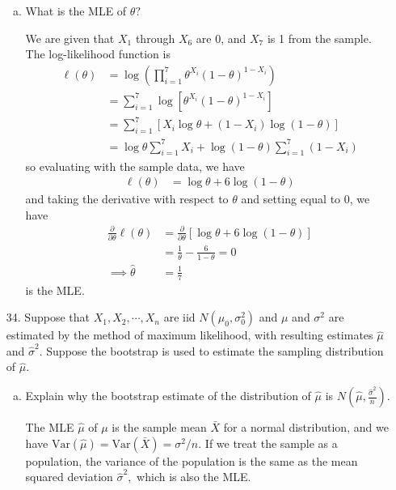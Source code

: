 \documentclass{article}
\newcommand{\var}{\mathrm{Var}}
\begin{document}
\begin{itemize}
\begin{enumerate}[a.]
			\item What is the MLE of $\theta?$
				\begin{soln}
					We are given that $X_1$ through $X_6$ are 0, and $X_7$ is 1 from the sample. The log-likelihood function is 
					\begin{align*}
						\ell(\theta) &= \log\left( \prod_{i=1}^7 \theta^{X_i}(1-\theta)^{1-X_i} \right) \\
						&= \sum_{i=1}^{7}\log\left[ \theta^{X_i}(1-\theta)^{1-X_i} \right] \\
						&= \sum_{i=1}^{7} \left[ X_i\log\theta + (1-X_i)\log (1-\theta) \right] \\
						&= \log\theta\sum_{i=1}^{7}X_i + \log(1-\theta)\sum_{i=1}^{7}(1-X_i)
					\end{align*} so evaluating with the sample data, we have 
					\begin{align*}
						\ell(\theta) &= \log\theta+6\log(1-\theta)
					\end{align*} and taking the derivative with respect to $\theta$ and setting equal to 0, we have 
					\begin{align*}
						\frac{\partial}{\partial\theta}\ell(\theta) &= \frac{\partial}{\partial\theta}\left[ \log\theta+6\log(1-\theta) \right] \\
						&= \frac{1}{\theta}-\frac{6}{1-\theta} = 0 \\
						\implies \hat{\theta} &= \frac{1}{7}
					\end{align*} is the MLE.
					
				\end{soln}
				
		\end{enumerate}

	\item[34.] Suppose that $X_1, X_2, \cdots, X_n$ are iid $N(\mu_0, \sigma_0^2)$ and $\mu$ and $\sigma^2$ are estimated by the method of maximum likelihood, with resulting estimates $\hat{\mu}$ and $\hat{\sigma}^2.$ Suppose the bootstrap is used to estimate the sampling distribution of $\hat{\mu}.$

		\begin{enumerate}[a.]
			\item Explain why the bootstrap estimate of the distribution of $\hat{\mu}$ is $N\left( \hat{\mu}, \frac{\hat{\sigma}^2}{n} \right).$
				\begin{answer*}
					The MLE $\hat{\mu}$ of $\mu$ is the sample mean $\bar{X}$ for a normal distribution, and we have $\var(\hat{\mu})=\var(\bar{X})=\sigma^2/n.$ If we treat the sample as a population, the variance of the population is the same as the mean squared deviation $\hat{\sigma}^2,$ which is also the MLE. 


\end{answer*}
\end{enumerate}
\end{itemize}
\end{document}
